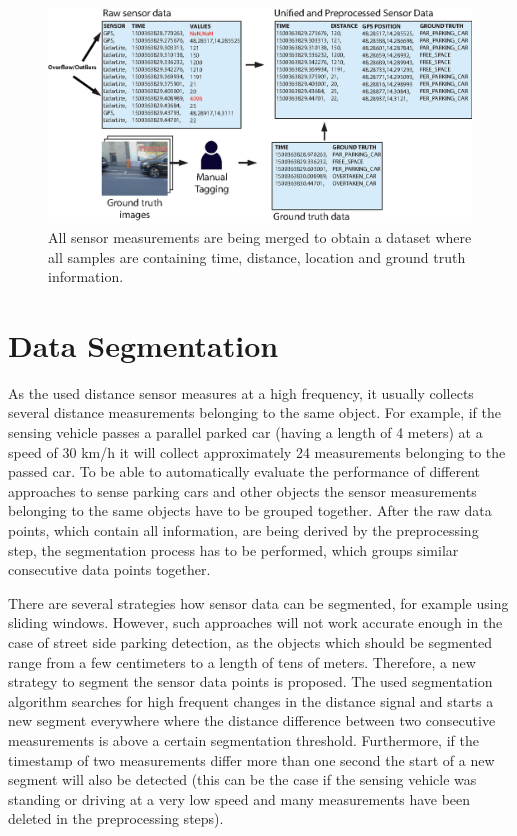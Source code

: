\begin{figure}
	\centering
	\includegraphics[width=\textwidth]{img/dataset-preprocessing.eps}
	\caption{All sensor measurements are being merged to obtain a dataset where all samples are containing time, distance, location and ground truth information.}
	\label{fig:preprocessing_dataset}
\end{figure}





\section{Data Segmentation}
\label{sec:data_segmentation}

As the used distance sensor measures at a high frequency, it usually collects several distance measurements belonging to the same object. For example, if the sensing vehicle passes a parallel parked car (having a length of 4 meters) at a speed of 30 km/h it will collect approximately 24 measurements belonging to the passed car. To be able to automatically evaluate the performance of different approaches to sense parking cars and other objects the sensor measurements belonging to the same objects have to be grouped together. After the raw data points, which contain all information, are being derived by the preprocessing step, the segmentation process has to be performed, which groups similar consecutive data points together.

There are several strategies how sensor data can be segmented, for example using sliding windows. However, such approaches will not work accurate enough in the case of street side parking detection, as the objects which should be segmented range from a few centimeters to a length of tens of meters. Therefore, a new strategy to segment the sensor data points is proposed. The used segmentation algorithm searches for high frequent changes in the distance signal and starts a new segment everywhere where the distance difference between two consecutive measurements is above a certain segmentation threshold. Furthermore, if the timestamp of two measurements differ more than one second the start of a new segment will also be detected (this can be the case if the sensing vehicle was standing or driving at a very low speed and many measurements have been deleted in the preprocessing steps). 

